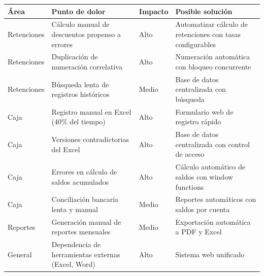 \documentclass[stu]{apa7}
\begin{document}
\begin{longtable}{|L{3cm}|L{4cm}|L{4cm}|L{4cm}|}
\hline
{}
\textbf{Área} & \textbf{Punto de dolor} & \textbf{Impacto} & \textbf{Posible solución} \\
\hline
\endhead
Retenciones & Cálculo manual de descuentos propenso a errores & Alto & Automatizar cálculo de retenciones con tasas configurables \\
\hline
Retenciones & Duplicación de numeración correlativa & Alto & Numeración automática con bloqueo concurrente \\
\hline
Retenciones & Búsqueda lenta de registros históricos & Medio & Base de datos centralizada con búsqueda \\
\hline
Caja & Registro manual en Excel (40\% del tiempo) & Alto & Formulario web de registro rápido \\
\hline
Caja & Versiones contradictorias del Excel & Alto & Base de datos centralizada con control de acceso \\
\hline
Caja & Errores en cálculo de saldos acumulados & Alto & Cálculo automático de saldos con window functions \\
\hline
Caja & Conciliación bancaria lenta y manual & Medio & Reportes automáticos con saldos por cuenta \\
\hline
Reportes & Generación manual de reportes mensuales & Medio & Exportación automática a PDF y Excel \\
\hline
General & Dependencia de herramientas externas (Excel, Word) & Alto & Sistema web unificado \\
\hline
\end{longtable}
\end{document}
